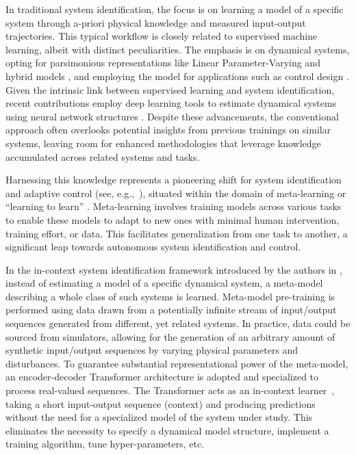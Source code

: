 \documentclass{ifacconf}
\begin{document}
In traditional system identification, the focus is on learning a model of a specific system through a-priori physical knowledge and measured input-output trajectories. %
This typical workflow is closely related to supervised machine learning, albeit with distinct peculiarities. The emphasis is on dynamical systems, opting for parsimonious representations like Linear Parameter-Varying and hybrid models \citep{bamieh2002identification, mejari2020recursive}, and employing the model for  applications such as control design \citep{bombois2006least, piga2019performance}. Given the intrinsic link between supervised learning and system identification, recent contributions employ  deep learning tools to estimate  dynamical systems using neural network structures \citep{masti2021learning,forgione2021continuous,forgione2021dynonet,beintema2023deep,pillonetto2023deep}. Despite these advancements, the conventional approach often overlooks potential insights from previous trainings on similar systems, leaving room for enhanced methodologies that leverage knowledge accumulated across related systems and tasks.

Harnessing this knowledge represents a pioneering shift for system identification and adaptive control (see,  e.g.,~\citet{zhan2022calibrating,richards2021adaptive,chakrabarty2023meta,balim2023can}), situated within the  domain of meta-learning or ``learning to learn'' \citep{schmidhuber1987evolutionary,finn2017model}. Meta-learning involves training models across various tasks to enable these models to adapt to new ones with minimal human intervention, training effort, or data. This facilitates generalization  from one task to another, a significant leap towards autonomous system identification and control.

In the in-context system identification framework introduced by the authors in \citet{forgione2023context}, instead of estimating a model of a specific dynamical system, a meta-model describing a whole class of such systems is 
learned.
Meta-model pre-training is performed using data drawn from a potentially infinite stream of input/output sequences generated from different, yet related systems.  In practice, data could be sourced from simulators, allowing for the generation of an arbitrary amount of synthetic input/output sequences by varying physical parameters and disturbances. 
  To guarantee substantial representational power of the meta-model, an encoder-decoder  Transformer architecture is adopted \citep{vaswani2017attention,radford2019language} and  specialized to process real-valued sequences. 
The Transformer acts as an in-context learner~\citep{kirsch2022general}, taking a short input-output sequence (context) and producing predictions without the need for a specialized model of the system under study. This eliminates the necessity to specify a dynamical model structure, implement a training algorithm,  tune hyper-parameters, etc.
 
\end{document}
